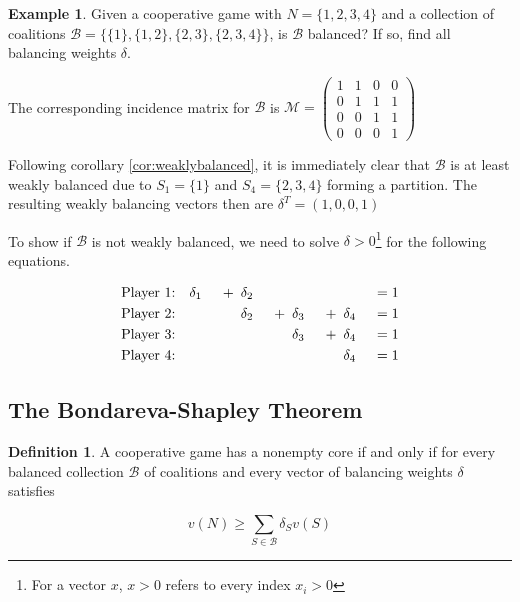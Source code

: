 \documentclass[10pt,a4paper,titlepage]{article}
\theoremstyle{plain}
\theoremstyle{definition}
\newtheorem{definition}[thm]{Definition} %
\newtheorem{example}[thm]{Example} %
\begin{document}
\begin{example}
    Given a cooperative game with $N = \{1, 2, 3, 4\}$ and a collection of coalitions $\mathcal{B} = \{\{1\}, \{1, 2\}, \{2, 3\}, \{2, 3, 4\}\}$, is $\mathcal{B}$ balanced? If so, find all balancing weights $\delta$.

    The corresponding incidence matrix for $\mathcal{B}$ is $\mathcal{M} = \begin{pmatrix}
        1 & 1 & 0 & 0\\
        0 & 1 & 1 & 1\\
        0 & 0 & 1 & 1\\
        0 & 0 & 0 & 1
    \end{pmatrix}$

    Following corollary \ref{cor:weaklybalanced}, it is immediately clear that $\mathcal{B}$ is at least weakly balanced due to $S_1 = \{1\}$ and $S_4 = \{2, 3, 4\}$ forming a partition. The resulting weakly balancing vectors then are $\delta^T = (1, 0, 0, 1)$

    To show if $\mathcal{B}$ is not weakly balanced, we need to solve $\delta > 0$\footnote{For a vector $x$, $x > 0$ refers to every index $x_i > 0$} for the following equations.

    \begin{alignat*}{8}
        \text{Player 1:} \quad & \delta_1 &\enskip + \enskip &\delta_2 & & & & &\enskip = 1\\
        \text{Player 2:} \quad & & &\delta_2 &\enskip + \enskip &\delta_3 &\enskip + \enskip&\delta_4 &\enskip = 1\\
        \text{Player 3:} \quad & & & & &\delta_3 &\enskip + \enskip&\delta_4 &\enskip = 1\\
        \text{Player 4:} \quad & & & & & & &\delta_4 &\enskip = 1
    \end{alignat*}
\end{example}

\subsection{The Bondareva-Shapley Theorem}

\begin{definition}
    A cooperative game has a nonempty core if and only if for every balanced collection $\mathcal{B}$ of coalitions and every vector of balancing weights $\delta$ satisfies

    \begin{equation}
        v(N) \geq \sum_{S \in \mathcal{B}} \delta_S v(S)
    \end{equation}
\end{definition}
\end{document}
